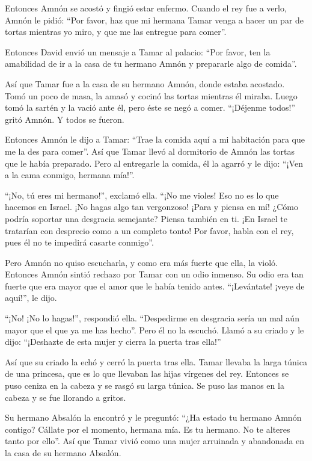 Entonces Amnón se acostó y fingió estar enfermo. Cuando el
rey fue a verlo, Amnón le pidió: ``Por favor, haz que mi hermana Tamar
venga a hacer un par de tortas mientras yo miro, y que me las entregue
para comer''.

 Entonces David envió un mensaje a Tamar al palacio: ``Por
favor, ten la amabilidad de ir a la casa de tu hermano Amnón y
prepararle algo de comida''.

 Así que Tamar fue a la casa de su hermano Amnón, donde
estaba acostado. Tomó un poco de masa, la amasó y cocinó las tortas
mientras él miraba.  Luego tomó la sartén y la vació ante
él, pero éste se negó a comer. ``¡Déjenme todos!'' gritó Amnón. Y todos
se fueron.

 Entonces Amnón le dijo a Tamar: ``Trae la comida aquí a mi
habitación para que me la des para comer''. Así que Tamar llevó al
dormitorio de Amnón las tortas que le había preparado. 
Pero al entregarle la comida, él la agarró y le dijo: ``¡Ven a la cama
conmigo, hermana mía!''.

 ``¡No, tú eres mi hermano!'', exclamó ella. ``¡No me
violes! Eso no es lo que hacemos en Israel. ¡No hagas algo tan
vergonzoso!  ¡Para y piensa en mí! ¿Cómo podría soportar
una desgracia semejante? Piensa también en ti. ¡En Israel te tratarían
con desprecio como a un completo tonto! Por favor, habla con el rey,
pues él no te impedirá casarte conmigo''.

 Pero Amnón no quiso escucharla, y como era más fuerte que
ella, la violó.  Entonces Amnón sintió rechazo por Tamar
con un odio inmenso. Su odio era tan fuerte que era mayor que el amor
que le había tenido antes. ``¡Levántate! ¡veye de aquí!'', le dijo.

 ``¡No! ¡No lo hagas!'', respondió ella. ``Despedirme en
desgracia sería un mal aún mayor que el que ya me has hecho''. Pero él
no la escuchó.  Llamó a su criado y le dijo: ``¡Deshazte de
esta mujer y cierra la puerta tras ella!''

 Así que su criado la echó y cerró la puerta tras ella.
Tamar llevaba la larga túnica de una princesa, que es lo que llevaban
las hijas vírgenes del rey.  Entonces se puso ceniza en la
cabeza y se rasgó su larga túnica. Se puso las manos en la cabeza y se
fue llorando a gritos.

 Su hermano Absalón la encontró y le preguntó: ``¿Ha estado
tu hermano Amnón contigo? Cállate por el momento, hermana mía. Es tu
hermano. No te alteres tanto por ello''. Así que Tamar vivió como una
mujer arruinada y abandonada en la casa de su hermano Absalón.

